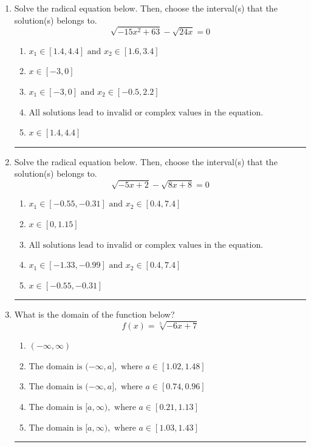 \documentclass[14pt]{extbook}
\newcommand{\litem}[1]{\item#1\hspace*{-1cm}\rule{\textwidth}{0.4pt}}
\begin{document}
\begin{enumerate}
{\begin{enumerate}[label=\Alph*.]
\end{enumerate} }
\litem{
Solve the radical equation below. Then, choose the interval(s) that the solution(s) belongs to.\[ \sqrt{-15 x^2 + 63} - \sqrt{24 x} = 0 \]\begin{enumerate}[label=\Alph*.]
\item \( x_1 \in [1.4, 4.4] \text{ and } x_2 \in [1.6,3.4] \)
\item \( x \in [-3,0] \)
\item \( x_1 \in [-3, 0] \text{ and } x_2 \in [-0.5,2.2] \)
\item \( \text{All solutions lead to invalid or complex values in the equation.} \)
\item \( x \in [1.4,4.4] \)

\end{enumerate} }
\litem{
Solve the radical equation below. Then, choose the interval(s) that the solution(s) belongs to.\[ \sqrt{-5 x + 2} - \sqrt{8 x + 8} = 0 \]\begin{enumerate}[label=\Alph*.]
\item \( x_1 \in [-0.55, -0.31] \text{ and } x_2 \in [0.4,7.4] \)
\item \( x \in [0,1.15] \)
\item \( \text{All solutions lead to invalid or complex values in the equation.} \)
\item \( x_1 \in [-1.33, -0.99] \text{ and } x_2 \in [0.4,7.4] \)
\item \( x \in [-0.55,-0.31] \)

\end{enumerate} }
\litem{
What is the domain of the function below?\[ f(x) = \sqrt[5]{-6 x + 7} \]\begin{enumerate}[label=\Alph*.]
\item \( (-\infty, \infty) \)
\item \( \text{The domain is } (-\infty, a], \text{   where } a \in [1.02, 1.48] \)
\item \( \text{The domain is } (-\infty, a], \text{   where } a \in [0.74, 0.96] \)
\item \( \text{The domain is } [a, \infty), \text{   where } a \in [0.21, 1.13] \)
\item \( \text{The domain is } [a, \infty), \text{   where } a \in [1.03, 1.43] \)


\end{enumerate}}
\end{enumerate}
\end{document}

